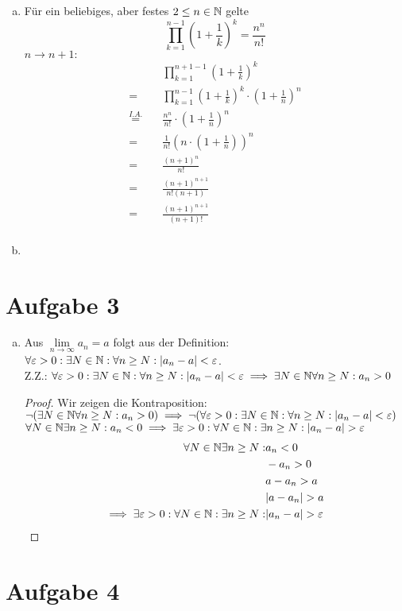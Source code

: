 \documentclass{article}
\begin{document}
\begin{enumerate}[(a)]
		\item {}
		{Für ein beliebiges, aber festes $2\leq n\in \mathbb{N}$ gelte $$\prod_{k=1}^{n-1}\left(1+\frac{1}{k}\right)^k = \frac{n^n}{n!}$$}
		{$n\to n+1:$ \begin{align*}
			&\quad \prod_{k=1}^{n+1-1}\left(1+\frac{1}{k}\right)^k\\
			=&\quad \prod_{k=1}^{n-1}\left(1+\frac{1}{k}\right)^k \cdot \left(1+\frac{1}{n}\right)^n\\
			\overset{I.A.}{=}&\quad \frac{n^n}{n!} \cdot \left(1+\frac{1}{n}\right)^n\\
			=&\quad \frac{1}{n!} \left(n \cdot \left(1+\frac{1}{n}\right)\right)^n\\
			=&\quad \frac{\left(n+1\right)^n}{n!}\\
			=&\quad \frac{\left(n+1\right)^{n+1}}{n!(n+1)}\\
			=&\quad \frac{\left(n+1\right)^{n+1}}{(n+1)!}\\
		\end{align*}
		}
		\item {}
	\end{enumerate}
	\section*{Aufgabe 3}
	\begin{enumerate}[(a)]
		\item Aus $\lim\limits_{n\to \infty} a_n = a$ folgt aus der Definition: $\forall \varepsilon > 0: \exists N\in \mathbb{N}: \forall n\geq N: |a_n-a| < \varepsilon$.\\
		Z.Z.: $\forall \varepsilon > 0: \exists N\in \mathbb{N}: \forall n\geq N: |a_n-a| < \varepsilon \implies \exists N\in \mathbb{N}\forall n\geq N: a_n>0$
		\begin{proof}
			Wir zeigen die Kontraposition: $\neg(\exists N\in \mathbb{N}\forall n\geq N: a_n>0) \implies \neg(\forall \varepsilon > 0: \exists N\in \mathbb{N}: \forall n\geq N: |a_n-a| < \varepsilon)$\\
			$\forall N\in \mathbb{N}\exists n\geq N: a_n<0 \implies \exists \varepsilon > 0: \forall N\in \mathbb{N}: \exists n\geq N: |a_n-a| > \varepsilon$\\
			\begin{align*}
				\forall N\in \N\exists n\geq N:& a_n<0\\
				& -a_n>0\\ 
				& a-a_n>a\\
				& |a-a_n|>a\\
				\implies \exists \varepsilon > 0: \forall N\in \N: \exists n\geq N:& |a_n-a| > \varepsilon
			\end{align*}
			
		\end{proof}
	\end{enumerate}
	\section*{Aufgabe 4}
\end{document}
